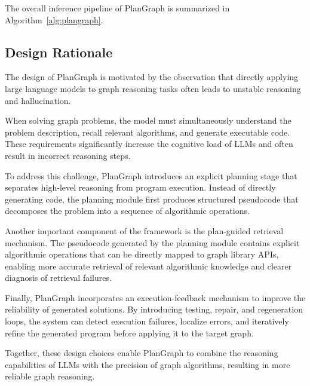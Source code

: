 \documentclass[sigconf,review,anonymous]{acmart}
\begin{document}
The overall inference pipeline of PlanGraph is summarized
in Algorithm~\ref{alg:plangraph}.




\subsection{Design Rationale}

The design of PlanGraph is motivated by the observation that
directly applying large language models to graph reasoning
tasks often leads to unstable reasoning and hallucination.

When solving graph problems, the model must simultaneously
understand the problem description, recall relevant
algorithms, and generate executable code. These requirements
significantly increase the cognitive load of LLMs and often
result in incorrect reasoning steps.

To address this challenge, PlanGraph introduces an explicit
planning stage that separates high-level reasoning from
program execution. Instead of directly generating code,
the planning module first produces structured pseudocode
that decomposes the problem into a sequence of algorithmic
operations.

Another important component of the framework is the
plan-guided retrieval mechanism. The pseudocode
generated by the planning module contains explicit
algorithmic operations that can be directly mapped to
graph library APIs, enabling more accurate retrieval of
relevant algorithmic knowledge and clearer diagnosis of
retrieval failures.

Finally, PlanGraph incorporates an execution-feedback mechanism
to improve the reliability of generated solutions. By
introducing testing, repair, and regeneration loops, the
system can detect execution failures, localize errors, and
iteratively refine the generated program before applying it
to the target graph.

Together, these design choices enable PlanGraph to combine
the reasoning capabilities of LLMs with the precision of
graph algorithms, resulting in more reliable graph reasoning.
\end{document}
